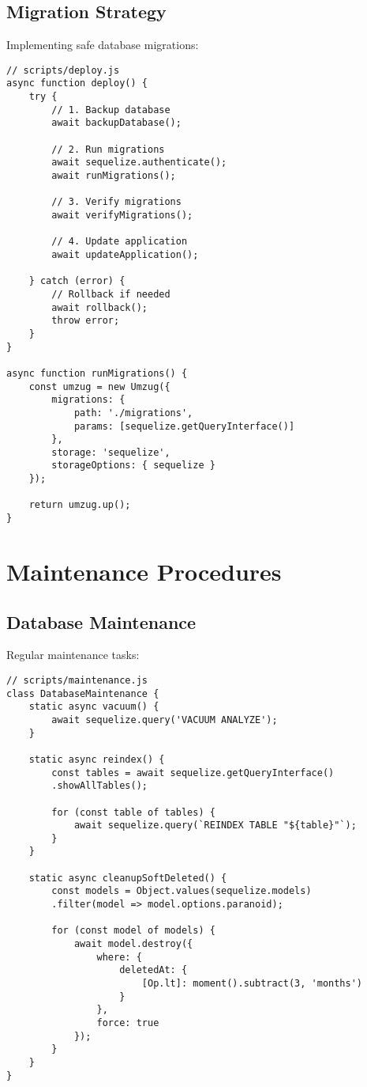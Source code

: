\documentclass[12pt,a4paper]{book}
\begin{document}
	\subsection{Migration Strategy}
	Implementing safe database migrations:
	
	\begin{verbatim}
// scripts/deploy.js
async function deploy() {
	try {
		// 1. Backup database
		await backupDatabase();
		
		// 2. Run migrations
		await sequelize.authenticate();
		await runMigrations();
		
		// 3. Verify migrations
		await verifyMigrations();
		
		// 4. Update application
		await updateApplication();
		
	} catch (error) {
		// Rollback if needed
		await rollback();
		throw error;
	}
}

async function runMigrations() {
	const umzug = new Umzug({
		migrations: {
			path: './migrations',
			params: [sequelize.getQueryInterface()]
		},
		storage: 'sequelize',
		storageOptions: { sequelize }
	});
	
	return umzug.up();
}
	\end{verbatim}
	
	\section{Maintenance Procedures}
	
	\subsection{Database Maintenance}
	Regular maintenance tasks:
	
	\begin{verbatim}
// scripts/maintenance.js
class DatabaseMaintenance {
	static async vacuum() {
		await sequelize.query('VACUUM ANALYZE');
	}
	
	static async reindex() {
		const tables = await sequelize.getQueryInterface()
		.showAllTables();
		
		for (const table of tables) {
			await sequelize.query(`REINDEX TABLE "${table}"`);
		}
	}
	
	static async cleanupSoftDeleted() {
		const models = Object.values(sequelize.models)
		.filter(model => model.options.paranoid);
		
		for (const model of models) {
			await model.destroy({
				where: {
					deletedAt: {
						[Op.lt]: moment().subtract(3, 'months')
					}
				},
				force: true
			});
		}
	}
}
	\end{verbatim}
	
\end{document}
